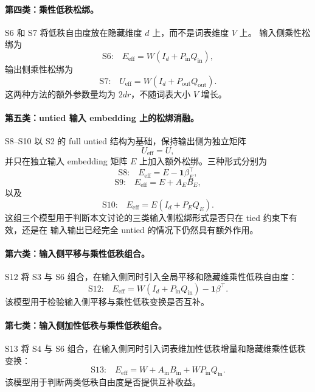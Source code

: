 \paragraph{第四类：乘性低秩松绑。}
S6 和 S7 将低秩自由度放在隐藏维度 $d$ 上，而不是词表维度 $V$ 上。
输入侧乘性松绑为
\begin{equation}
    \text{S6:}\quad
    E_{\mathrm{eff}} = W(I_d+P_{\mathrm{in}}Q_{\mathrm{in}}),
\end{equation}
输出侧乘性松绑为
\begin{equation}
    \text{S7:}\quad
    U_{\mathrm{eff}} = W(I_d+P_{\mathrm{out}}Q_{\mathrm{out}}).
\end{equation}
这两种方法的额外参数量均为 $2dr$，不随词表大小 $V$ 增长。

\paragraph{第五类：untied 输入 embedding 上的松绑消融。}
S8--S10 以 S2 的 full untied 结构为基础，保持输出侧为独立矩阵
\begin{equation}
    U_{\mathrm{eff}} = U,
\end{equation}
并只在独立输入 embedding 矩阵 $E$ 上加入额外松绑。三种形式分别为
\begin{equation}
    \text{S8:}\quad
    E_{\mathrm{eff}} = E-\mathbf{1}\beta_E^\top,
\end{equation}
\begin{equation}
    \text{S9:}\quad
    E_{\mathrm{eff}} = E+A_EB_E,
\end{equation}
以及
\begin{equation}
    \text{S10:}\quad
    E_{\mathrm{eff}} = E(I_d+P_EQ_E).
\end{equation}
这组三个模型用于判断本文讨论的三类输入侧松绑形式是否只在 tied 约束下有效，还是在
输入输出已经完全 untied 的情况下仍然具有额外作用。

\paragraph{第六类：输入侧平移与乘性低秩组合。}
S12 将 S3 与 S6 组合，在输入侧同时引入全局平移和隐藏维乘性低秩自由度：
\begin{equation}
    \text{S12:}\quad
    E_{\mathrm{eff}} =
    W(I_d+P_{\mathrm{in}}Q_{\mathrm{in}})-\mathbf{1}\beta^\top.
\end{equation}
该模型用于检验输入侧平移与乘性低秩变换是否互补。

\paragraph{第七类：输入侧加性低秩与乘性低秩组合。}
S13 将 S4 与 S6 组合，在输入侧同时引入词表维加性低秩增量和隐藏维乘性低秩变换：
\begin{equation}
    \text{S13:}\quad
    E_{\mathrm{eff}} =
    W+A_{\mathrm{in}}B_{\mathrm{in}}+WP_{\mathrm{in}}Q_{\mathrm{in}}.
\end{equation}
该模型用于判断两类低秩自由度是否提供互补收益。

